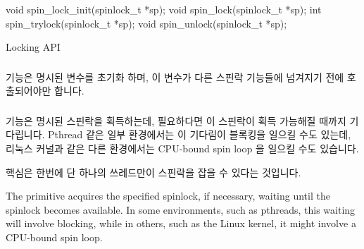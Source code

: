 \begin{listing}[tbp]
\begin{VerbatimL}[numbers=none]
void spin_lock_init(spinlock_t *sp);
void spin_lock(spinlock_t *sp);
int spin_trylock(spinlock_t *sp);
void spin_unlock(spinlock_t *sp);
\end{VerbatimL}
\caption{Locking API}
\label{lst:toolsoftrade:Locking API}
\end{listing}

\subsubsection{}

 기능은 명시된  변수를 초기화 하며, 이
변수가 다른 스핀락 기능들에 넘겨지기 전에 호출되어야만 합니다.

\subsubsection{}

 기능은 명시된 스핀락을 획득하는데, 필요하다면 이 스핀락이
획득 가능해질 때까지 기다립니다.
Pthread 같은 일부 환경에서는 이 기다림이 블록킹을 일으킬 수도 있는데, 리눅스
커널과 같은 다른 환경에서는 CPU-bound spin loop 을 일으킬 수도 있습니다.

핵심은 한번에 단 하나의 쓰레드만이 스핀락을 잡을 수 있다는 것입니다.

\iffalse

The  primitive acquires the specified spinlock,
if necessary, waiting until the spinlock becomes available.
In some environments, such as pthreads, this waiting will involve
blocking, while in others, such as the Linux kernel, it might involve
a CPU-bound spin loop.

